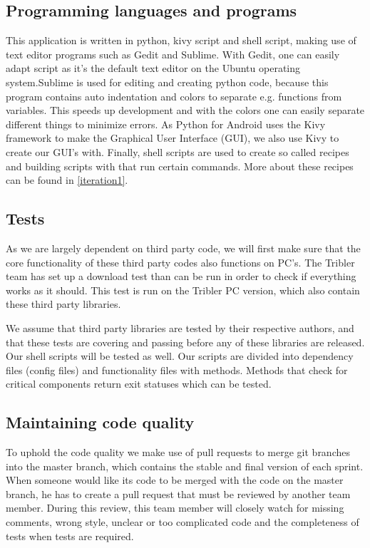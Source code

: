 \subsection{Programming languages and programs}
\label{programminglang}
This application is written in python, kivy script and shell script, making use of text editor programs such as Gedit and Sublime. With Gedit, one can easily adapt script as it's the default text editor on the Ubuntu operating system.Sublime is used for editing and creating python code, because this program contains auto indentation and colors to separate e.g. functions from variables. This speeds up development and with the colors one can easily separate different things to minimize errors.
As Python for Android uses the Kivy framework to make the Graphical User Interface (GUI), we also use Kivy to create our GUI's with.
Finally, shell scripts are used to create so called recipes and building scripts with that run certain commands. More about these recipes can be found in \ref{iteration1}.

\subsection{Tests}
As we are largely dependent on third party code, we will first make sure that the core functionality of these third party codes also functions on PC's. The Tribler team has set up a download test than can be run in order to check if everything works as it should. This test is run on the Tribler PC version, which also contain these third party libraries.

We assume that third party libraries are tested by their respective authors, and that these tests are covering and passing before any of these libraries are released.
Our shell scripts will be tested as well. Our scripts are divided into dependency files (config files) and functionality files with methods. Methods that check for critical components return exit statuses which can be tested.

\subsection{Maintaining code quality}
\label{codeQuality}
To uphold the code quality we make use of pull requests to merge git branches into the master branch, which contains the stable and final version of each sprint. When someone would like its code to be merged with the code on the master branch, he has to create a pull request that must be reviewed by another team member. During this review, this team member will closely watch for missing comments, wrong style, unclear or too complicated code and the completeness of tests when tests are required.

